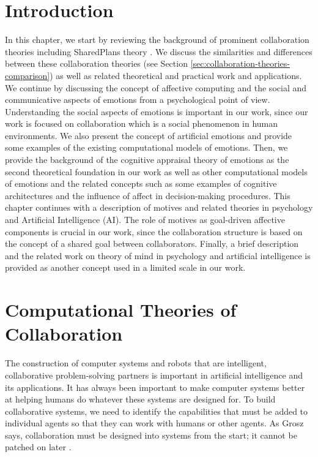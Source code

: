 \documentclass[12pt]{report}
\begin{document}
\section{Introduction}
\vspace*{-3mm}
In this chapter, we start by reviewing the background of prominent collaboration
theories including SharedPlans theory \cite{grosz:plans-discourse}. We
discuss the similarities and differences between these collaboration theories
(see Section \ref{sec:collaboration-theories-comparison}) as well as related
theoretical and practical work and applications. We continue by discussing the
concept of affective computing and the social and communicative aspects of
emotions from a psychological point of view. Understanding the social aspects of
emotions is important in our work, since our work is focused on collaboration
which is a social phenomenon in human environments. We also present the concept
of artificial emotions and provide some examples of the existing computational
models of emotions. Then, we provide the background of the cognitive appraisal
theory of emotions as the second theoretical foundation in our work as well as
other computational models of emotions and the related concepts such as some
examples of cognitive architectures and the influence of affect in
decision-making procedures. This chapter continues with a description of motives
and related theories in psychology and Artificial Intelligence (AI). The role of
motives as goal-driven affective components is crucial in our work, since the
collaboration structure is based on the concept of a shared goal between
collaborators. Finally, a brief description and the related work on theory of
mind in psychology and artificial intelligence is provided as another concept
used in a limited scale in our work.

\section{Computational Theories of Collaboration}
The construction of computer systems and robots that are intelligent,
collaborative problem-solving partners is important in artificial intelligence
and its applications. It has always been important to make computer systems
better at helping humans do whatever these systems are designed for. To build
collaborative systems, we need to identify the capabilities that must be added
to individual agents so that they can work with humans or other agents. As Grosz
says, collaboration must be designed into systems from the start; it cannot be
patched on later \cite{grosz:collaborative-systems}.
\end{document}
